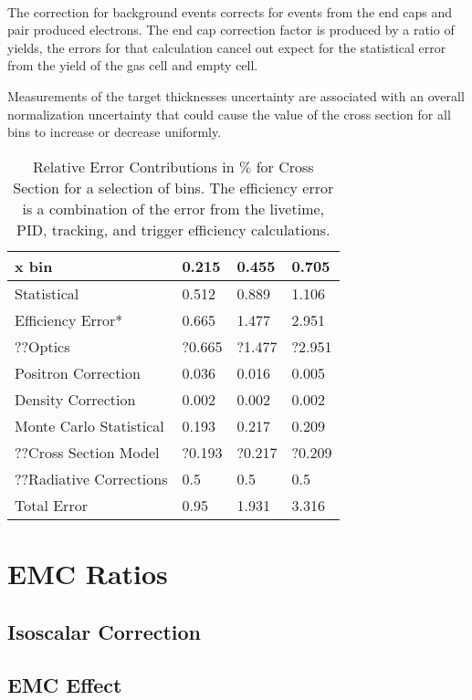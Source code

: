 \paragraph{}The correction for background events corrects for events from the end caps and pair produced electrons. The end cap correction factor is produced by a ratio of yields, the errors for that calculation cancel out expect for the statistical error from the yield of the gas cell and empty cell. 

Measurements of the target thicknesses uncertainty are associated with an overall normalization uncertainty that could cause the value of the cross section for all bins to increase or decrease uniformly.


\begin{table}[]
	\caption{Relative Error Contributions in $\%$ for Cross Section for a selection of bins. The efficiency error is a combination of the error from the livetime, PID, tracking, and trigger efficiency calculations.}
	\centering
	\begin{tabular}{|l|l|l|l|}
		\hline
		\textbf{\qquad \qquad\qquad x bin}   & \textbf{0.215} & \textbf{0.455} & \textbf{0.705} \\ \hline\hline
		Statistical             & 0.512 & 0.889 & 1.106 \\ \hline
		Efficiency Error*       & 0.665 & 1.477 & 2.951 \\ \hline
		??Optics 				& ?0.665& ?1.477 &?2.951 \\ \hline
		Positron Correction     & 0.036 & 0.016 & 0.005 \\ \hline
		Density Correction      & 0.002 & 0.002 & 0.002 \\ \hline
		Monte Carlo Statistical & 0.193 & 0.217 & 0.209 \\ \hline
		??Cross Section Model 	& ?0.193 & ?0.217 & ?0.209 \\ \hline
		??Radiative Corrections\cite{primer} 	& 0.5  & 0.5 & 0.5 \\ \hline
		Total Error		 	 	& 0.95  & 1.931 & 3.316 \\ \hline
	\end{tabular}
\end{table}
\cite{Ar_Ti}


\section{EMC Ratios}

\subsection{Isoscalar Correction}
\subsection{EMC Effect}

